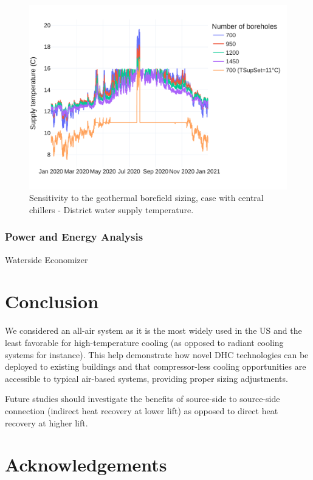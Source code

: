 \begin{figure}[!htbp]
    \centering
    \includegraphics[width=.7\linewidth]{../python_scripts/figures/GeoSizing_chillers.pdf}
    \caption{Sensitivity to the geothermal borefield sizing, case with central chillers - District water supply temperature.}
    \label{fig:chillers_tsup}
\end{figure}




\subsubsection{Power and Energy Analysis} \label{sec:power_energy}



Waterside Economizer







\section{Conclusion} \label{sec:concl}

We considered an all-air system as it is the most widely used in the US and the least favorable for high-temperature cooling (as opposed to radiant cooling systems for instance).
This help demonstrate how novel DHC technologies can be deployed to existing buildings and that compressor-less cooling opportunities are accessible to typical air-based systems, providing proper sizing adjustments.

Future studies should investigate the benefits of source-side to source-side connection (indirect heat recovery at lower lift) as opposed to direct heat recovery at higher lift.


\section{Acknowledgements} \label{sec:acknowledge}

